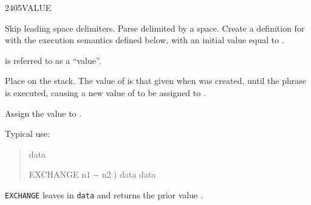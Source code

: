 \begin{worddef}{2405}{VALUE}
\item {}

	Skip leading space delimiters. Parse  delimited by
	a space. Create a definition for  with the execution
	semantics defined below, with an initial value equal to .

	 is referred to as a ``value''.

\execute[name]

	Place  on the stack. The value of  is that
	given when  was created, until the phrase 
	  is executed, causing a new value of
	 to be assigned to .


	Assign the value  to .


	\begin{rationale} %
		Typical use:
		\begin{quote}  data

			\word{:} EXCHANGE  n1 -{}- n2 )
				data   data
			\word{;}
		\end{quote}
		\texttt{EXCHANGE} leaves  in \texttt{data} and
		returns the prior value .
	\end{rationale}

	\begin{testing} %
		 \\
		 \\
		 \\
		 \\
		 \\

		 \\

		 \\
		 \\
		 \\
		 \\
	\end{testing}
\end{worddef}


